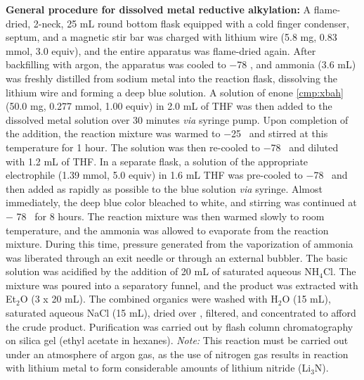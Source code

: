 \vspace{10pt}
\noindent\textbf{General procedure for dissolved metal reductive alkylation:}
A flame-dried, 2-neck, 25 mL round bottom
flask equipped with a cold finger condenser, septum, and a magnetic stir bar was charged with
lithium wire (5.8 mg, 0.83 mmol, 3.0 equiv), and the entire apparatus was flame-dried again.
After backfilling with argon, the apparatus was cooled to $-$78 \degc, and ammonia (3.6 mL) was
freshly distilled from sodium metal into the reaction flask, dissolving the lithium wire and
forming a deep blue solution. A solution of enone \ref{cmp:xbah} (50.0 mg, 0.277 mmol, 1.00 equiv)
in 2.0 mL of THF was then added to the dissolved metal solution over 30 minutes \textit{via} syringe
pump.
Upon completion of the addition, the reaction mixture was warmed to $-$25 \degc\  and stirred at
this temperature for 1 hour. The solution was then re-cooled to $-$78 \degc\  and diluted with 1.2
mL of THF. In a separate flask, a solution of the appropriate electrophile (1.39 mmol, 5.0 equiv) in
1.6 mL THF was pre-cooled to $-$78 \degc\  and then added as rapidly as possible to the blue
solution \textit{via} syringe.
Almost immediately, the deep blue color bleached to white, and stirring was continued at $-$
78 \degc\  for 8 hours. The reaction mixture was then warmed slowly to room temperature, and the
ammonia was allowed to evaporate from the reaction mixture. During this time, pressure generated from the vaporization of ammonia was liberated through an exit needle or through an
external bubbler. The basic solution was acidified by the addition of 20 mL of saturated aqueous
NH$_4$Cl. The mixture was poured into a separatory funnel, and the product was extracted with
Et$_2$O (3 x 20 mL). The combined organics were washed with H$_2$O (15 mL), saturated aqueous
NaCl (15 mL), dried over , filtered, and concentrated to afford the crude product.
Purification was carried out by flash column chromatography on silica gel (ethyl acetate in
hexanes). \textit{Note:} This reaction must be carried out under an atmosphere of argon gas, as the
use of nitrogen gas results in reaction with lithium metal to form considerable amounts of lithium nitride (Li$_3$N).

